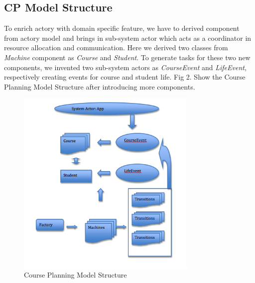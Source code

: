 \documentclass{sig-alternate}
\begin{document}
\subsection{CP Model Structure}
To enrich actory with domain specific feature, we have to derived component from actory model and brings in sub-system actor which acts as a coordinator in resource allocation and communication. Here we derived two classes from {\em Machine} component as {\em Course} and {\em Student}.    To generate tasks for these two new components, we invented two sub-system actors as {\em CourseEvent} and {\em LifeEvent}, respectively creating events for course and student life.  Fig 2. Show the Course Planning Model Structure after introducing more components.\\
\begin{figure}[!h]
\centering
\includegraphics[height=90mm ]{courseplanmodel}
\caption{Course Planning Model Structure}
\end{figure}
\end{document}
